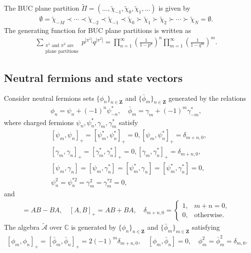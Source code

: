 \documentclass[11pt,reqno]{amsart}
\numberwithin{equation}{section}
\begin{document}
	The BUC plane partition $\tilde{\Pi}=(\ldots,\tilde{\chi}_{-1},\tilde{\chi}_0,\tilde{\chi}_1,\ldots)$ is given by
	\begin{eqnarray}\label{BUC-interlacing-partitions} \emptyset=\tilde{\chi}_{-M}\prec\cdots\prec\tilde{\chi}_{-2}\prec\tilde{\chi}_{-1}\prec\tilde{\chi}_{0}\succ\tilde{\chi}_{1}\succ\tilde{\chi}_{2}\succ\cdots\succ\tilde{\chi}_{N}=\emptyset.
	\end{eqnarray}
	The generating function for BUC plane partitions is  written as
	\begin{align}\label{UC-generating-function}
		\sum_{\begin{smallmatrix}\pi^{1}\text{ and }\pi^{2}\text{ are}\\\text{plane partitions}\end{smallmatrix}}
		p^{|\pi^{1}|}q^{|\pi^{2}|}
		=\prod_{n=1}^\infty\left(\frac1{1-p^n}\right)^n\prod_{m=1}^\infty\left(\frac1{1-q^m}\right)^m.
	\end{align}
	
	
	
	\subsection{Neutral fermions and state vectors}
	Consider neutral fermions sets $\{\phi_{n}\}_{n\in\mathbf{Z}}$ and $\{\bar{\phi}_{m}\}_{n\in\mathbf{Z}}$ generated by the relations
	\begin{align}
		\phi_{n}=\psi_{n}+(-1)^{n}\psi_{-n}^{*},\quad
		\bar{\phi}_{m}=\gamma_{m}+(-1)^{m}\gamma_{-m}^{*},
	\end{align}
	where charged fermions $\psi_{n},\psi_{n}^{*},\gamma_{m},\gamma_{m}^{*}$ satisfy
	\begin{align}
		&[\psi_m,\psi_n]_{+} = [\psi_m^*,\psi_n^*]_{+} = 0,[\psi_m,\psi_n^*]_{+} = \delta_{m+n,0},\\
		&[\gamma_m,\gamma_n]_{+} = [\gamma_m^*,\gamma_n^*]_{+} = 0,[\gamma_m,\gamma_n^*]_{+} = \delta_{m+n,0},\\
		&[\psi_{m},\gamma_{n}]=[\psi_{m},\gamma_{n}^{*}]=[\psi_{m}^{*},\gamma_{n}]=[\psi_{m}^{*},\gamma_{n}^{*}]=0,\\
		&\psi_n^2=\psi_n^{*2}=\gamma_m^2=\gamma_m^{*2}=0,
	\end{align}
and
	\begin{align}
		[A, B] = AB - BA, \quad [A, B]_+ = AB + BA, \quad 	 \delta_{m+n,0}=\begin{cases}1,&m+n=0,\\0,&\mathrm{otherwise}.\end{cases}
	\end{align}
	The algebra $\widetilde{\mathcal{A}}$ over
	$\mathbb{C}$ is generated by $\{\phi_{n}\}_{n\in\mathbf{Z}}$ and $\{\bar{\phi}_{m}\}_{m\in\mathbf{Z}}$ satisfying
	\begin{align}\label{commutation relations 1.2}
		 [\phi_{m},\phi_{n}]_{+}=[\bar{\phi}_{m},\bar{\phi}_{n}]_{+}=2(-1)^{m}\delta_{m+n,0},\quad[\phi_{m},\bar{\phi}_{n}]=0,\quad \phi_{m}^{2}=\bar{\phi}_{m}^{2}=\delta_{m,0}.
	\end{align}
	
\end{document}
